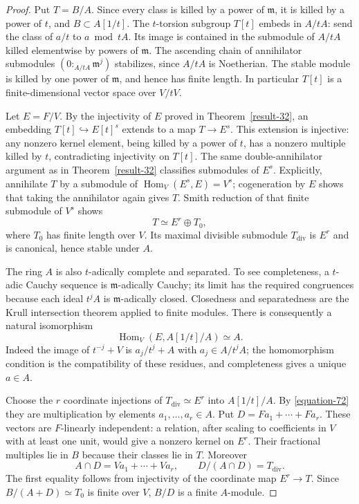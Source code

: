 \documentclass[11pt,a4paper]{article}
\theoremstyle{definition}
\begin{document}
\begin{proof}
Put $T=B/A$. Since every class is killed by a power
of $\mathfrak m$, it is killed by a power of $t$,
and $B\subset A[1/t]$.
The $t$-torsion subgroup $T[t]$ embeds in $A/tA$:
send the class of $a/t$ to $a\bmod tA$.
Its image is contained in the submodule of $A/tA$
killed elementwise by powers of $\mathfrak m$.
The ascending chain of annihilator submodules
$(0:_{A/tA}\mathfrak m^j)$ stabilizes, since
$A/tA$ is Noetherian. The stable module is killed
by one power of $\mathfrak m$, and hence has finite
length. In particular $T[t]$ is a finite-dimensional
vector space over $V/tV$.

Let $E=F/V$. By the injectivity of $E$ proved in
Theorem~\ref{result-32}, an embedding $T[t]\hookrightarrow E[t]^s$
extends to a map $T\to E^s$. This extension is
injective: any nonzero kernel element, being killed
by a power of $t$, has a nonzero multiple killed
by $t$, contradicting injectivity on $T[t]$.
The same double-annihilator argument as in Theorem~\ref{result-32}
classifies submodules of $E^s$. Explicitly, annihilate
$T$ by a submodule of
$\operatorname{Hom}_V(E^s,E)=V^s$; cogeneration by
$E$ shows that taking the annihilator again gives
$T$. Smith reduction of that finite submodule of
$V^s$ shows
\[
                            T\simeq E^r\oplus T_0,
\]
where $T_0$ has finite length over $V$.
Its maximal divisible submodule $T_{\mathrm{div}}$
is $E^r$ and is canonical, hence stable under $A$.

The ring $A$ is also $t$-adically complete and
separated. To see completeness, a $t$-adic Cauchy
sequence is $\mathfrak m$-adically Cauchy; its limit
has the required congruences because each ideal
$t^jA$ is $\mathfrak m$-adically closed.
Closedness and separatedness are the Krull
intersection theorem applied to finite modules.
There is consequently a natural isomorphism
\begin{equation}
 \operatorname{Hom}_V(E,A[1/t]/A)\simeq A.                  \label{equation-72}
\end{equation}
Indeed the image of $t^{-j}+V$ is
$a_j/t^j+A$ with $a_j\in A/t^jA$; the homomorphism
condition is the compatibility of these residues,
and completeness gives a unique $a\in A$.

Choose the $r$ coordinate injections of
$T_{\mathrm{div}}\simeq E^r$ into $A[1/t]/A$.
By \eqref{equation-72} they are multiplication by elements
$a_1,\ldots,a_r\in A$. Put
$D=Fa_1+\cdots+Fa_r$.
These vectors are $F$-linearly independent:
a relation, after scaling to coefficients in
$V$ with at least one unit, would give a nonzero
kernel on $E^r$.
Their fractional multiples lie in $B$ because
their classes lie in $T$. Moreover
\[
              A\cap D=Va_1+\cdots+Va_r,\qquad
              D/(A\cap D)=T_{\mathrm{div}}.
\]
The first equality follows from injectivity of
the coordinate map $E^r\to T$.
Since $B/(A+D)\simeq T_0$ is finite over $V$,
$B/D$ is a finite $A$-module.


\end{proof}
\end{document}
